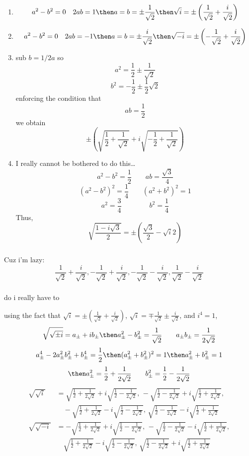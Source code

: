 \subsubsection{}
\begin{enumerate}[label = (\alph*)]
	\item
		\[a^2-b^2=0\quad 2ab=1\then a=b=\pm\frac{1}{\sqrt{2}}\then \sqrt{i} = \pm\left(\frac{1}{\sqrt{2}}+\frac{i}{\sqrt{2}}\right)\]
	\item
		\[a^2-b^2=0\quad 2ab=-1\then a=b=\pm\frac{i}{\sqrt{2}}\then \sqrt{-i} = \pm \left(-\frac{1}{\sqrt{2}}+\frac{i}{\sqrt{2}}\right)\]
		\item 
			sub \(b=1/2a\) so
\[a^2 = \frac{1}{2}\pm\frac{1}{\sqrt{2}}\]
\[b^2 = -\frac{1}{2}\pm\frac{1}{2}\sqrt{2}\]
enforcing the condition that
\[ab = \frac{1}{2}\]
we obtain
\[\pm \left(\sqrt{\frac{1}{2}+\frac{1}{\sqrt{2}}}+i\sqrt{-\frac{1}{2}+\frac{1}{\sqrt{2}}}\right)\]
\item I really cannot be bothered to do this\ldots
	\[a^2-b^2 = \frac{1}{2}\qquad ab = \frac{\sqrt{3}}{4}\]
	\[(a^2-b^2)^2 = \frac{1}{4}\qquad (a^2+b^2)^2 = 1\]
	\[a^2 = \frac{3}{4}\qquad\qquad b^2 = \frac{1}{4}\]
	Thus,
	\[\sqrt{\frac{1-i\sqrt{3}}{2}} = \pm\left(\frac{\sqrt{3}}{2}-\sqrt{i}{2}\right)\]
\end{enumerate}
\subsubsection{}
Cuz i'm lazy:
\[\frac{1}{\sqrt{2}}+\frac{i}{\sqrt{2}},-\frac{1}{\sqrt{2}}+\frac{i}{\sqrt{2}},-\frac{1}{\sqrt{2}}-\frac{i}{\sqrt{2}},\frac{1}{\sqrt{2}}-\frac{i}{\sqrt{2}}\]
\subsubsection{}
do i really have to

using the fact that \(\sqrt{i} = \pm\left(\frac{1}{\sqrt{2}}+\frac{i}{\sqrt{2}}\right)\), \(\sqrt{i} = \mp\frac{1}{\sqrt{2}}\pm\frac{i}{\sqrt{2}}\), and \(i^4=1\),
\[\sqrt{\sqrt{\pm i}}=a_\pm+ib_\pm\then a_\pm^2-b_\pm^2 = \frac{1}{\sqrt{2}}\qquad a_\pm b_\pm=\frac{1}{2\sqrt{2}}\]
\[a^4_\pm - 2a_\pm^2b_\pm^2 + b_\pm^4 = \frac{1}{2}\then (a_\pm^2+b_\pm^2)^2 = 1\then a_\pm^2+b_\pm^2=1\]
\[\then a_\pm^2 = \frac{1}{2}+\frac{1}{2\sqrt{2}}\qquad b_\pm^2 = \frac{1}{2}-\frac{1}{2\sqrt{2}}\]
\begin{align*}
	\sqrt{\sqrt{i}}&= \sqrt{\frac{1}{2}+\frac{1}{2\sqrt{2}}}+i\sqrt{\frac{1}{2}-\frac{1}{2\sqrt{2}}},\, -\sqrt{\frac{1}{2}-\frac{1}{2\sqrt{2}}}+i\sqrt{\frac{1}{2}+\frac{1}{2\sqrt{2}}},\\
		       &\quad-\sqrt{\frac{1}{2}+\frac{1}{2\sqrt{2}}}-i\sqrt{\frac{1}{2}-\frac{1}{2\sqrt{2}}},\,\sqrt{\frac{1}{2}-\frac{1}{2\sqrt{2}}}-i\sqrt{\frac{1}{2}+\frac{1}{2\sqrt{2}}}\\
	\sqrt{\sqrt{-i}}&= -\sqrt{\frac{1}{2}+\frac{1}{2\sqrt{2}}}+i\sqrt{\frac{1}{2}-\frac{1}{2\sqrt{2}}},\, -\sqrt{\frac{1}{2}-\frac{1}{2\sqrt{2}}}-i\sqrt{\frac{1}{2}+\frac{1}{2\sqrt{2}}},\\
		       &\quad\sqrt{\frac{1}{2}+\frac{1}{2\sqrt{2}}}-i\sqrt{\frac{1}{2}-\frac{1}{2\sqrt{2}}},\,\sqrt{\frac{1}{2}-\frac{1}{2\sqrt{2}}}+i\sqrt{\frac{1}{2}+\frac{1}{2\sqrt{2}}}\\
\end{align*}
